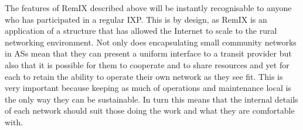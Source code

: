 The features of RemIX described above will be instantly recognisable
to anyone who has participated in a regular \ac{IXP}. This is by
design, as RemIX is an application of a structure that has allowed the
Internet to scale to the rural networking environment. Not only does
encapsulating small community networks in \acp{AS} mean that they can
present a uniform interface to a transit provider but also that it is
possible for them to cooperate and to share resources and yet for each
to retain the ability to operate their own network as they see
fit. This is very important because keeping as much of operations and
maintenance local is the only way they can be sustainable. In turn
this means that the internal details of each network should suit those
doing the work and what they are comfortable with.

